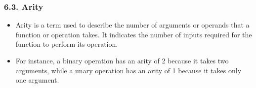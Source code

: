 \documentclass{article}
\begin{document}
\subsubsection*{6.3. Arity}
\begin{itemize}
\item Arity is a term used to describe the number of arguments or operands that a function or operation takes. It indicates the number of inputs required for the function to perform its operation.
\item For instance, a binary operation has an arity of 2 because it takes two arguments, while a unary operation has an arity of 1 because it takes only one argument.
\end{itemize}
\end{document}
